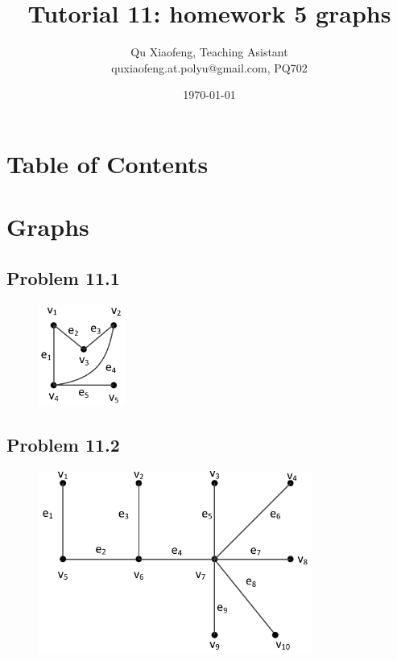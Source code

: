 \documentclass[
        handout,
        ]{beamer}
\title[Tutorial 11]{Tutorial 11: homework 5 graphs}
\author[COMP210]{Qu Xiaofeng\texorpdfstring{, Teaching Asistant\\\tiny{quxiaofeng.at.polyu@gmail.com, PQ702}}{}}
\institute{COMP210\\Discrete Structure}
\date{\today}
\begin{document}
\titlepage

\section*{Table of Contents}
    \begin{frame}{\secname}
        \tableofcontents
    \end{frame}

\section{Graphs}
    \subsection{Problem 11.1}
        \begin{frame}[c]{\subsecname}
                \begin{figure}
                    \centering
                    \includegraphics[width=28.6mm]{tut11p10}
                \end{figure}
        \end{frame}
    \subsection{Problem 11.2}
        \begin{frame}[c]{\subsecname}
                \begin{figure}
                    \centering
                    \includegraphics[width=90mm]{tut11p10_2}
                \end{figure}
        \end{frame}
\end{document}
